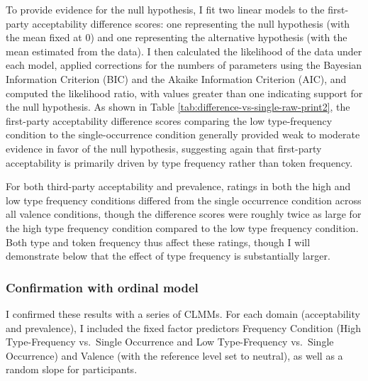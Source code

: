 \documentclass[
]{article}
\begin{document}
To provide evidence for the null hypothesis, I fit two linear models to the first-party acceptability difference scores: one representing the null hypothesis (with the mean fixed at 0) and one representing the alternative hypothesis (with the mean estimated from the data). I then calculated the likelihood of the data under each model, applied corrections for the numbers of parameters using the Bayesian Information Criterion (BIC) and the Akaike Information Criterion (AIC), and computed the likelihood ratio, with values greater than one indicating support for the null hypothesis. As shown in Table \ref{tab:difference-vs-single-raw-print2}, the first-party acceptability difference scores comparing the low type-frequency condition to the single-occurrence condition generally provided weak to moderate evidence in favor of the null hypothesis, suggesting again that first-party acceptability is primarily driven by type frequency rather than token frequency.

For both third-party acceptability and prevalence, ratings in both the high and low type frequency conditions differed from the single occurrence condition across all valence conditions, though the difference scores were roughly twice as large for the high type frequency condition compared to the low type frequency condition. Both type and token frequency thus affect these ratings, though I will demonstrate below that the effect of type frequency is substantially larger.

\clearpage

\subsubsection{Confirmation with ordinal model}\label{confirmation-with-ordinal-model}

I confirmed these results with a series of CLMMs. For each domain (acceptability and prevalence), I included the fixed factor predictors Frequency Condition (High Type-Frequency vs.~Single Occurrence and Low Type-Frequency vs.~Single Occurrence) and Valence (with the reference level set to neutral), as well as a random slope for participants.
\end{document}
